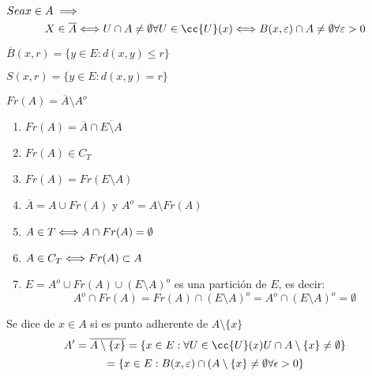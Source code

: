     \begin{definicion}
        $Sea \\ x \in A \implies$
        $$X\in \overline{A} \\ \sii\\ U \cap A \neq \emptyset \\ \forall U \in \cc{U}(x) \\ \sii\\ B(x,\varepsilon ) \cap A \neq \emptyset \\ \forall \varepsilon >0$$
    \end{definicion}

    \begin{definicion}
        $\overline{B}(x, r) = \{ y \in E : d(x,y) \leq r\}$
    \end{definicion}

    \begin{definicion}[Esfera]
        $S(x,r) = \{ y \in E: d(x,y) = r\}$
    \end{definicion}

    \begin{definicion}[Frontera]
        $Fr(A) = \overline{A} \setminus A^o$
    \end{definicion} 
    
    \begin{enumerate}
        \item $Fr(A) = \overline{A} \cap \overline{E\setminus A}$
        \item $Fr(A) \in C_T$
        \item $Fr(A) = Fr(E\setminus A)$
        \item $\overline{A} = A\cup Fr(A)$ y $A^o = A \setminus Fr(A)$
        \item $A \in T \\ \Longleftrightarrow \\ A \cap Fr(A) = \emptyset$
        \item $A \in C_T \\ \Longleftrightarrow \\ Fr(A) \subset A$
        \item $E = A^o \cup Fr(A) \cup (E\setminus A)^o$ es una partición de $E$, es decir:
        $$A^o \cap Fr(A) =  Fr(A) \cap (E\setminus A)^o = A^o \cap (E\setminus A)^o = \emptyset$$
    \end{enumerate}

    \begin{definicion}
        Se dice de $x\in A$ si es punto adherente de $A\setminus \{x\}$
        $$A' = \overline{A\setminus \{x\}} = \{x \in E : \forall U \in \cc{U}(x) \\ U \cap A\setminus \{x\} \neq \emptyset \} $$
        $$= \{x \in E : B(x, \varepsilon) \cap (A\setminus \{x\} \neq \emptyset \\ \forall \epsilon >0\}$$
    \end{definicion}    

